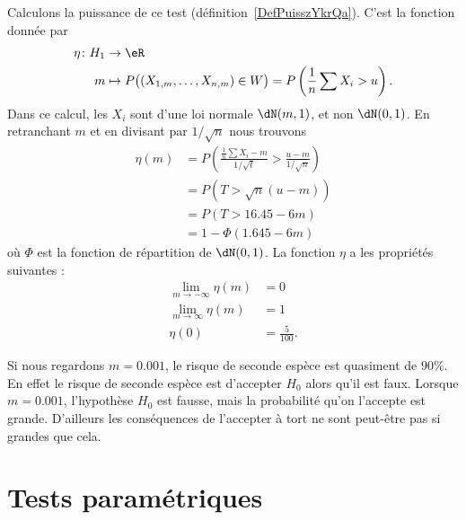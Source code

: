 Calculons la puissance de ce test (définition~\ref{DefPuisszYkrQa}). C'est la fonction donnée par
    \begin{equation}
        \begin{aligned}
            \eta\colon H_1&\to \eR \\
            m&\mapsto P\big( (X_{1,m},\ldots, X_{n,m})\in W \big)=P\left( \frac{1}{ n }\sum X_i>u \right) .
        \end{aligned}
    \end{equation}
    Dans ce calcul, les \( X_i\) sont d'une loi normale \( \dN(m,1)\), et non \( \dN(0,1)\). En retranchant \( m\) et en divisant par \( 1/\sqrt{n}\) nous trouvons
    \begin{subequations}
        \begin{align}
            \eta(m)&=P\left( \frac{ \frac{1}{ n }\sum X_i-m }{ 1/\sqrt{t} }>\frac{ u-m }{ 1/\sqrt{n} } \right) \\
            &=P(T>\sqrt{n}(u-m))\\
            &=P(T>16.45-6m)\\
            &=1-\Phi(1.645-6m)
        \end{align}
    \end{subequations}
où \( \Phi\) est la fonction de répartition de \( \dN(0,1)\). La fonction \( \eta\) a les propriétés suivantes :
\begin{subequations}
    \begin{align}
        \lim_{m\to-\infty}\eta(m)&=0\\
        \lim_{m\to\infty}\eta(m)&=1\\
        \eta(0)&=\frac{ 5 }{ 100 }.
    \end{align}
\end{subequations}

\begin{remark}
    Si nous regardons \( m=0.001\), le risque de seconde espèce est quasiment de \( 90\%\). En effet le risque de seconde espèce est d'accepter \( H_0\) alors qu'il est faux. Lorsque \( m=0.001\), l'hypothèse \( H_0\) est fausse, mais la probabilité qu'on l'accepte est grande. D'ailleurs les conséquences de l'accepter à tort ne sont peut-être pas si grandes que cela.
\end{remark}

\section{Tests paramétriques}

